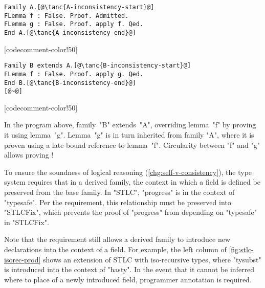\begin{centered}
\begin{minipage}{36ex}
\begin{lstlisting}[basicstyle=\fontsize{8.25}{9}\ttfamily]
Family A.[@\tanc{A-inconsistency-start}@]
FLemma f : False. Proof. Admitted.
FLemma g : False. Proof. apply f. Qed.
End A.[@\tanc{A-inconsistency-end}@]
\end{lstlisting}
\end{minipage}
[codecomment-color!50]
\hspace{3.5em}
\begin{minipage}{36ex}
\begin{lstlisting}[basicstyle=\fontsize{8.25}{9}\ttfamily]
Family B extends A.[@\tanc{B-inconsistency-start}@]
FLemma f : False. Proof. apply g. Qed.
End B.[@\tanc{B-inconsistency-end}@]
[@~@]
\end{lstlisting}
\end{minipage}
[codecomment-color!50]
\end{centered}

\noindent
In the program above, family~"B" extends~"A", overriding lemma~"f" by
proving it using lemma~"g".
Lemma~"g" is in turn inherited from family "A", where it is proven using
a late bound reference to lemma~"f".
Circularity between "f" and "g" allows proving !

To ensure the soundness of logical reasoning (\ref{chg:self-v-consistency}),
the type system requires that in a derived family, the context in which
a field is defined be preserved from the base family.
In "STLC", "progress" is in the context of "typesafe".
Per the requirement, this relationship must be preserved into
"STLCFix", which prevents the proof of "progress" from depending on
"typesafe" in "STLCFix".

Note that the requirement still allows a derived family to introduce
new declarations into the context of a field. %
For example, the left column of \cref{fig:stlc-isorec-prod} shows an
extension of STLC with iso-recursive types, where "tysubst" is
introduced into the context of "hasty".
%
In the event that it cannot be inferred where to place of a newly introduced field,
programmer annotation is required. 

